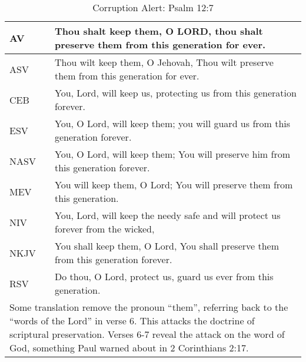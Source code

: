 
\begin{center}

\begin{table}[ht]
\centering
\begin{tabular}{|p{.5in}|p{3.5in}|}
    \hline
\textcolor[rgb]{0.00,0.00,1.00}{AV} & \textcolor[rgb]{0.00,0.00,1.00}{Thou shalt keep them, O LORD, thou shalt preserve them from this generation for ever.} \\ \hline
ASV &  Thou wilt keep them, O Jehovah, Thou wilt preserve them from this generation for ever.\\ \hline
%
CEB &  You, Lord, will keep us, protecting us from this generation forever.\\ \hline
ESV & You, O Lord, will keep them;  you will guard us from this generation forever.\\ \hline
%
NASV &  You, O Lord, will keep them; You will preserve him from this generation forever.\\ \hline
%
MEV & You will keep them, O Lord;  You will preserve them from this generation.\\ \hline
%
NIV &  You, Lord, will keep the needy safe  and will protect us forever from the wicked, \\ \hline
%
NKJV &  You shall keep them, O Lord, You shall preserve them from this generation forever.\\ \hline
%
RSV &  Do thou, O Lord, protect us,  guard us ever from this generation.\\ \hline
%

\multicolumn{2}{p{4.3in}}{{Some translation remove the pronoun ``them'', referring back to the ``words of the Lord'' in verse 6. This attacks the doctrine of scriptural preservation. Verses 6-7 reveal the attack on the word of God, something Paul warned about in 2 Corinthians 2:17.}} \\ \hline
\end{tabular}
\caption[Corruption Alert: Psalm 12:7]{Corruption Alert: Psalm 12:7} \label{table:Corruption Psalm 12:7}

\end{table}

\end{center}


